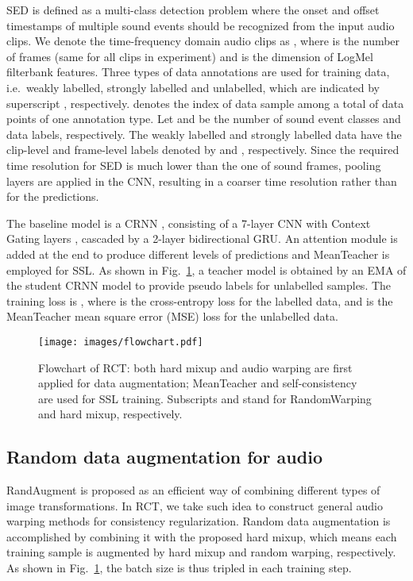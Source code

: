 \documentclass[a4paper]{article}
\begin{document}
SED is defined as a multi-class detection problem where the onset and offset timestamps of multiple sound events should be recognized from the input audio clips. We denote the time-frequency domain audio clips as , where  is the number of frames (same for all clips in experiment) and  is the dimension of LogMel filterbank features. Three types of data annotations are used for training data, i.e.~weakly labelled, strongly labelled and unlabelled, which are indicated by superscript , respectively.  denotes the index of data sample among a total of  data points of one annotation type. Let  and  be the number of sound event classes and data labels, respectively. The weakly labelled and strongly labelled data have the clip-level and frame-level labels denoted by  and , respectively. Since the required time resolution for SED is much lower than the one of sound frames, pooling layers are applied in the CNN, resulting in a coarser time resolution  rather than  for the predictions.

The baseline model is a CRNN \cite{jiakai2018mean}, consisting of a 7-layer CNN with Context Gating layers \cite{Miech2017LearnablePW}, cascaded by a 2-layer bidirectional GRU. An attention module is added at the end to produce different levels of predictions \cite{jiakai2018mean} and MeanTeacher \cite{tarvainen2017mean} is employed for SSL. As shown in Fig.~\ref{figure: scheme}, a teacher model is obtained by an EMA of the student CRNN model to provide pseudo labels for unlabelled samples. The training loss is , where  is the cross-entropy loss for the labelled data, and  is the MeanTeacher mean square error (MSE) loss for the unlabelled data. 

\begin{figure}[htb]
\begin{minipage}[b]{1.0\linewidth}
  \centering
  \centerline{\texttt{[image: images/flowchart.pdf]}}
\end{minipage}
\vspace{-6.7mm}
\caption{Flowchart of RCT: both hard mixup and audio warping are first applied for data augmentation; MeanTeacher \cite{tarvainen2017mean} and self-consistency are used for SSL training. Subscripts  and  stand for RandomWarping and hard mixup, respectively.}
\label{figure: scheme}
\vspace{-7.3mm}
\end{figure}

\subsection{Random data augmentation for audio}
RandAugment \cite{cubuk2020randaugment} is proposed as an efficient way of combining different types of image transformations. In RCT, we take such idea to construct general audio warping methods for consistency regularization. Random data augmentation is accomplished by combining it with the proposed hard mixup, which means each training sample is augmented by hard mixup and random warping, respectively. As shown in Fig.~\ref{figure: scheme}, the batch size is thus tripled in each training step.
\end{document}
